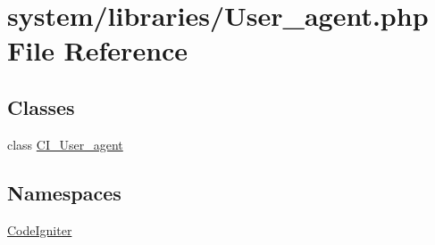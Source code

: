 \hypertarget{_user__agent_8php}{}\section{system/libraries/\+User\+\_\+agent.php File Reference}
\label{_user__agent_8php}
\subsection*{Classes}
\begin{DoxyCompactItemize}
\item 
class \mbox{\hyperlink{class_c_i___user__agent}{C\+I\+\_\+\+User\+\_\+agent}}
\end{DoxyCompactItemize}
\subsection*{Namespaces}
\begin{DoxyCompactItemize}
\item 
 \mbox{\hyperlink{namespace_code_igniter}{Code\+Igniter}}
\end{DoxyCompactItemize}
